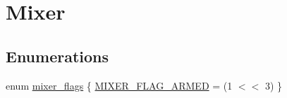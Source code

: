 \hypertarget{group__MIXER}{\section{Mixer}
\label{group__MIXER}
}
\subsection*{Enumerations}
\begin{DoxyCompactItemize}
\item 
enum \hyperlink{group__MIXER_ga8f455127e5b0a5e7f8f3e1b9df164f3c}{mixer\+\_\+flags} \{ \hyperlink{group__MIXER_gga8f455127e5b0a5e7f8f3e1b9df164f3ca336b47f092a05ec681ab024a7b25fe9e}{M\+I\+X\+E\+R\+\_\+\+F\+L\+A\+G\+\_\+\+A\+R\+M\+E\+D} = (1 $<$$<$ 3)
 \}
\end{DoxyCompactItemize}
